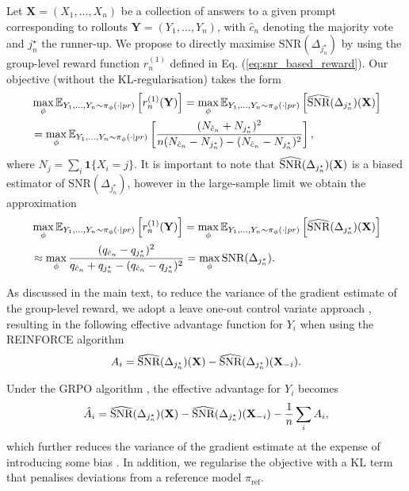 Let $\mathbf{X} = (X_1, \dots, X_n)$ be a collection of answers to a given prompt corresponding to rollouts $\mathbf{Y} = (Y_1, \dots, Y_n)$, with $\widehat{c}_n$ denoting the majority vote and $j_n^\star$  the runner-up. We propose to directly maximise $\text{SNR}(\Delta_{j^\star_n})$ by using the group-level reward function $r_n^{(1)}$ defined in Eq. (\ref{eq:snr_based_reward}).
Our objective (without the KL-regularisation) takes the form
\begin{align*}
&\max_\phi \mathbb{E}_{Y_1, \dots, Y_n\sim \pi_\phi(\cdot|pr)}\left[r_n^{(1)}(\mathbf{Y})\right] = \max_\phi \mathbb{E}_{Y_1, \dots, Y_n\sim \pi_\phi(\cdot|pr)}\left[\reallywidehat{\text{SNR}}(\Delta_{j_n^\star})(\mathbf X)\right]\\
&= \max_\phi \mathbb{E}_{Y_1, \dots, Y_n\sim \pi_\phi(\cdot|pr)} \left[\frac{(N_{\hat{c}_n}+N_{{j}_n^\star})^2}{n(N_{\hat{c}_n}-N_{{j}_n^\star}) - (N_{\hat{c}_n}-N_{{j}_n^\star})^2}\right],
\end{align*}
where $N_j= \sum_i\mathbf{1}\{X_i=j\}$.
It is important to note that $\reallywidehat{\text{SNR}}(\Delta_{j_n^\star})(\mathbf X)$ is a biased estimator of ${\text{SNR}}(\Delta_{j_n^\star})$, however in the large-sample limit we obtain the approximation
\begin{align*}
&\max_\phi \mathbb{E}_{Y_1, \dots, Y_n\sim \pi_\phi(\cdot|pr)}\left[r_n^{(1)}(\mathbf{Y})\right] = \max_\phi \mathbb{E}_{Y_1, \dots, Y_n\sim \pi_\phi(\cdot|pr)}\left[\reallywidehat{\text{SNR}}(\Delta_{j_n^\star})(\mathbf X)\right]\\
&\approx \max_\phi \frac{(q_{\hat{c}_n}-q_{j^\star_n})^2}{q_{\hat{c}_n}+q_{j^\star_n}-(q_{\hat{c}_n}-q_{j^\star_n})^2} = \max_\phi {\text{SNR}}(\Delta_{j_n^\star}).
\end{align*}

As discussed in the main text, to reduce the variance of the gradient estimate of the group-level reward, we adopt a leave one-out control variate approach \citep{tang2025optimizing}, resulting in the following effective advantage function for $Y_i$  when using the REINFORCE algorithm \citep{reinforce_92}
\begin{equation}\label{eq:effective_advantage_reinforce}
A_i = \reallywidehat{\text{SNR}}(\Delta_{j_n^\star})(\mathbf X) - \reallywidehat{\text{SNR}}(\Delta_{j_n^\star})(\mathbf X_{-i}). 
\end{equation}

Under the GRPO algorithm \citep{shao2024deepseekmathpushinglimitsmathematical}, the effective advantage for $Y_i$ becomes
\begin{equation}\label{eq:effective_advantage_GRPO}
\hat A_i = \reallywidehat{\text{SNR}}(\Delta_{j_n^\star})(\mathbf X) - \reallywidehat{\text{SNR}}(\Delta_{j_n^\star})(\mathbf X_{-i}) - \frac{1}{n}\sum_i A_i, 
\end{equation}
which further reduces the variance of the gradient estimate at the expense of introducing some bias \citep{tang2025optimizing}.
In addition, we regularise the objective with a KL term that penalises deviations from a reference model $\pi_{\text{ref}}$. 

